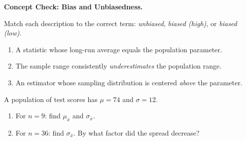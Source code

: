 \documentclass[10pt]{article}
\begin{document}
\namepartnerperiod

\vspace{0.1in}

\begin{tcolorbox}[colback=redbg, colframe=black!40, boxrule=0.6pt, arc=2mm,
    left=3mm, right=3mm, top=2mm, bottom=2mm, title=\textbf{Tier R --- Remediate}]
\textbf{Concept Check: Bias and Unbiasedness.}

Match each description to the correct term: \textit{unbiased}, \textit{biased (high)}, or \textit{biased (low)}.

\begin{enumerate}
  \item A statistic whose long-run average equals the population parameter.
        \blank{1.5in}
  \item The sample range consistently \emph{underestimates} the population range.
        \blank{1.5in}
  \item An estimator whose sampling distribution is centered \emph{above} the parameter.
        \blank{1.5in}
\end{enumerate}

\medskip
A population of test scores has $\mu = 74$ and $\sigma = 12$.
\begin{enumerate}[resume]
  \item For $n = 9$: find $\mu_{\bar{x}}$ and $\sigma_{\bar{x}}$. \vspace{0.5in}
  \item For $n = 36$: find $\sigma_{\bar{x}}$. By what factor did the spread decrease?
        \vspace{0.5in}
\end{enumerate}
\end{tcolorbox}

\vspace{0.12in}
\end{document}
